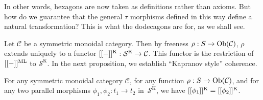 In other words, hexagons are now taken as definitions rather than axioms. But how do we guarantee that the  general $\tau$ morphisms defined in this way define a natural transformation? This is what the dodecagons are for, as we shall see.

\smallskip
Let $\mathcal{C}$  be a symmetric monoidal category. Then by freeness  $\rho : S \to \mathrm{Ob}(\mathcal{C})$, $\rho$ extends uniquely to a functor $[[-]]^{\mathrm{K}}:\mathcal{S}^{\mathrm{K}} \to \mathcal{C}$.
This functor is the restriction of $[[-]]^{\mathrm{ML}}$ to $\mathcal{S}^{\mathrm{K}}$.
In the next proposition, we  establish ``Kapranov style'' coherence.



\begin{proposition}
\label{thm:coherence-Kapranov}
    For any symmetric monoidal category $\mathcal{C}$, for any  function $\rho : S \to \mathrm{Ob}(\mathcal{C})$, and for any two parallel morphisms $\phi_1,\phi_2: t_1 \to t_2$ in~$\mathcal{S}^{\mathrm{K}}$, we have $[[\phi_1]]^{\mathrm{K}}=[[\phi_2]]^{\mathrm{K}}$.
\end{proposition}
